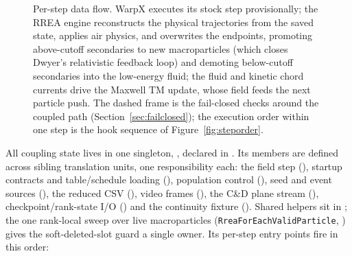 \documentclass[11pt]{article}
\DeclareRobustCommand{\code}[1]{\ifmmode\text{\ttfamily#1}\else\nolinkurl{#1}\fi}
\begin{document}
\begin{figure}[H]
  \caption{Per-step data flow. WarpX executes its stock step provisionally;
  the RREA engine reconstructs the physical trajectories from the saved state,
  applies air physics, and overwrites the endpoints, promoting above-cutoff secondaries to new
  macroparticles (which closes Dwyer's relativistic feedback loop)
  and demoting below-cutoff secondaries into the low-energy fluid; the
  fluid and kinetic chord currents drive the Maxwell TM update, whose field
  feeds the next particle push. The dashed frame is
  the fail-closed checks around the coupled path
  (Section~\ref{sec:failclosed}); the execution order within one step is
  the hook sequence of Figure~\ref{fig:steporder}.}
  \label{fig:dataflow}
\end{figure}

All coupling state lives in one singleton,
, declared in
.  Its members are
defined across sibling translation units, one responsibility each: the field
step (), startup contracts and table/schedule
loading (), population control
(), seed and event sources
(), the reduced CSV
(), video frames
(), the C\&D plane stream
(), checkpoint/rank-state I/O
() and the continuity fixture
(). Shared helpers sit in
; the one rank-local sweep over live macroparticles
(\code{RreaForEachValidParticle}, ) gives the
soft-deleted-slot guard a single owner.
Its per-step entry points fire in this order:
\end{document}
